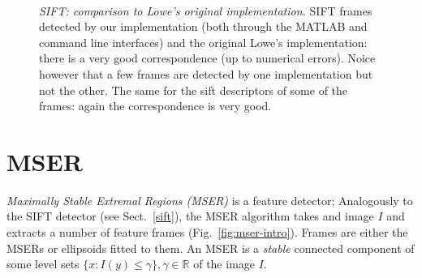 \documentclass[9.5pt]{article}
\newcommand{\real}{\ensuremath{\mathbb{R}}}
\begin{document}
\begin{figure}
\begin{center}
\hfill
{}\\
\end{center}
\caption{ {\em SIFT: comparison to Lowe's original implementation.}
  \protect{} SIFT frames detected by our
  implementation (both through the MATLAB and command line interfaces)
  and the original Lowe's implementation: there is a very good
  correspondence (up to numerical errors).  Noice however that a few
  frames are detected by one implementation but not the other.
  \protect{} The same for the sift descriptors of some
  of the frames: again the correspondence is very good.}
\label{fig:sift-conformity}
\end{figure}

\section{MSER}\label{mser}

{\em Maximally Stable Extremal Regions (MSER)} is a feature detector; Analogously to
the SIFT detector (see Sect.~\ref{sift}), the MSER algorithm takes and image $I$ and extracts a number of feature frames (Fig.~\ref{fig:mser-intro}). Frames are either the MSERs or ellipsoids fitted to them. An MSER is a {\em stable} connected component of some level sets $\{x:I(y)\leq\gamma\}, \gamma\in\real$ of the image $I$.

\begin{figure*}[t]
\hfill
{}
\hfill
{}
\caption{{\em MSER: frames} \protect{}
  a test image, \protect{} detected MSERs (positive and negative), \protect{} MSERs as fitted ellipses.}
\label{fig:mser-intro}
\end{figure*}
\end{document}
